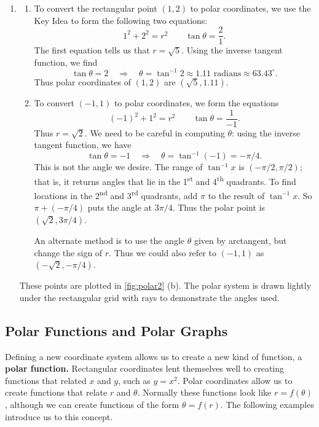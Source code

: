 \begin{example}
\begin{enumerate}
	\item \begin{enumerate}
		\item To convert the rectangular point $(1,2)$ to polar coordinates, we use the Key Idea to form the following two equations:
		\[1^2+2^2 = r^2 \qquad \tan \theta = \frac{2}{1}.\]
		The first equation tells us that $r=\sqrt{5}$. Using the inverse tangent function, we find
		\[\tan \theta = 2 \quad \Rightarrow \quad \theta = \tan^{-1} 2 \approx 1.11\text{ radians}\approx 63.43^\circ.\]
		Thus polar coordinates of $(1,2)$ are $(\sqrt{5},1.11)$.
		\item		To convert $(-1,1)$ to polar coordinates, we form the equations 
		\[(-1)^2+1^2=r^2 \qquad \tan \theta = \frac{1}{-1}.\]
		Thus $r=\sqrt{2}$. We need to be careful in computing $\theta$: using the inverse tangent function, we have
		\[\tan\theta = -1 \quad \Rightarrow \quad \theta = \tan^{-1}(-1) = -\pi/4.\]
		This is not the angle we desire. The range of $\tan^{-1}x $ is $(-\pi/2,\pi/2)$; that is, it returns angles that lie in the 1\textsuperscript{st} and 4\textsuperscript{th} quadrants. To find locations in the 2\textsuperscript{nd}  and 3\textsuperscript{rd} quadrants, add $\pi$ to the result of $\tan^{-1}x$. So  $\pi+(-\pi/4)$ puts the angle at $3\pi/4$. Thus the polar point is $(\sqrt{2},3\pi/4)$.
		
		An alternate method is to use the angle $\theta$ given by arctangent, but change the sign of $r$. Thus we could also refer to $(-1,1)$ as\\ $(-\sqrt{2},-\pi/4)$.
	\end{enumerate}
These points are plotted in \autoref{fig:polar2} (b). The polar system is drawn lightly under the rectangular grid with rays to demonstrate the angles used.
\end{enumerate}
\end{example}

\subsection{Polar Functions and Polar Graphs}

Defining a new coordinate system allows us to create a new kind of function, a \textbf{polar function.} Rectangular coordinates lent themselves well to creating functions that related $x$ and $y$, such as $y=x^2$. Polar coordinates allow us to create functions that relate $r$ and $\theta$. Normally these functions look like $r=f(\theta)$, although we can create functions of the form $\theta = f(r)$. The following examples introduce us to this concept.


